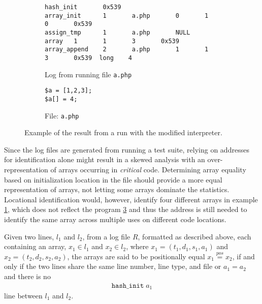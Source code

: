 \begin{figure}
\centering
\begin{subfigure}{\textwidth}
\begin{lstlisting}[mathescape, deletekeywords={array},basicstyle=\tiny]
hash_init       0x539
array_init      1       a.php       0       1       0       0x539
assign_tmp      1       a.php       NULL    array   1       1       3       0x539
array_append    2       a.php       1       1       3       0x539  long    4
\end{lstlisting}
\caption{Log from running file \texttt{a.php}}
\label{lst:id_array_code_out}
\end{subfigure}
\begin{subfigure}{\textwidth}
\begin{lstlisting}
$a = [1,2,3];
$a[] = 4;
\end{lstlisting}
\caption{File: \texttt{a.php}}
\label{lst:id_array_code}
\end{subfigure}
\caption{Example of the result from a run with the modified interpreter.}
\end{figure}

Since the log files are generated from running a test suite, relying on addresses for identification alone might result in a skewed analysis with an over-representation of arrays occurring in \emph{critical} code. Determining array equality based on initialization location in the file should provide a more equal representation of arrays, not letting some arrays dominate the statistics. Locational identification would, however, identify four different arrays in example \ref{lst:id_array_code_out}, which does not reflect the program \ref{lst:id_array_code} and thus the address is still needed to identify the same array across multiple uses on different code locations.


\begin{definition}
Given two lines, $l_1$ and $l_2$, from a log file $R$, formatted as described above, each containing an array, $x_1\in l_1$ and $x_2\in l_2$, where $x_1 = (t_1,d_1,s_1,a_1)$ and $x_2 = (t_2,d_2,s_2,a_2)$, the arrays are said to be positionally equal $x_1\stackrel{pos}{=} x_2$, if and only if the two lines share the same line number, line type, and file or $a_1 = a_2$ and there is no 
\begin{align*}
\texttt{hash\_init}\;a_1
\end{align*}
line between $l_1$ and $l_2$.
\end{definition}

